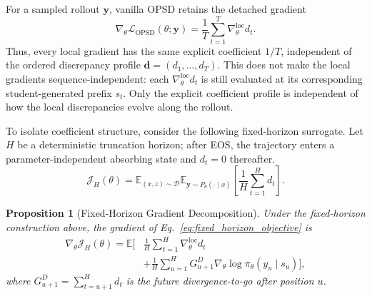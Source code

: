 \documentclass[letterpaper]{article} %
\newtheorem{proposition}{Proposition}    %
\begin{document}
For a sampled rollout $\mathbf y$, vanilla OPSD retains the detached gradient
\begin{equation}
    \nabla_\theta
    \mathcal L_{\mathrm{OPSD}}(\theta;\mathbf y)
    =
    \frac{1}{T}
    \sum_{t=1}^{T}
    \nabla_\theta^{\mathrm{loc}} d_t.
    \label{eq:detached_opsd_gradient}
\end{equation}
Thus, every local gradient has the same explicit coefficient $1/T$, independent of the ordered discrepancy profile $\mathbf d=(d_1,\ldots,d_T)$. This does not make the local gradients sequence-independent: each $\nabla_\theta^{\mathrm{loc}}d_t$ is still evaluated at its corresponding student-generated prefix $s_t$. Only the explicit coefficient profile is independent of how the local discrepancies evolve along the rollout.



To isolate coefficient structure, consider the following fixed-horizon
surrogate. Let $H$ be a deterministic truncation horizon; after EOS,
the trajectory enters a parameter-independent absorbing state and
$d_t=0$ thereafter.
\begin{equation}
    \mathcal J_H(\theta)
    =
    \mathbb E_{(x,z)\sim\mathcal D}
    \mathbb E_{\mathbf y\sim P_\theta(\cdot\mid x)}
    \left[
        \frac{1}{H}
        \sum_{t=1}^{H}d_t
    \right].
    \label{eq:fixed_horizon_objective}
\end{equation}

\begin{proposition}[Fixed-Horizon Gradient Decomposition]
\label{prop:exact_gradient_decomposition}
Under the fixed-horizon construction above, the gradient of
Eq.~\eqref{eq:fixed_horizon_objective} is
\begin{equation}
\begin{split}
    \nabla_\theta\mathcal J_H(\theta)
    =
    \mathbb E\Bigg[
        &\frac{1}{H}
        \sum_{t=1}^{H}
        \nabla_\theta^{\mathrm{loc}}d_t
        \\
        &+
        \frac{1}{H}
        \sum_{u=1}^{H}
        G^D_{u+1}
        \nabla_\theta
        \log\pi_\theta(y_u\mid s_u)
    \Bigg],
    \label{eq:exact_opsd_gradient}
\end{split}
\end{equation}
where
$G^D_{u+1}=\sum_{t=u+1}^{H}d_t$
is the future divergence-to-go after position $u$.
\end{proposition}
\end{document}
